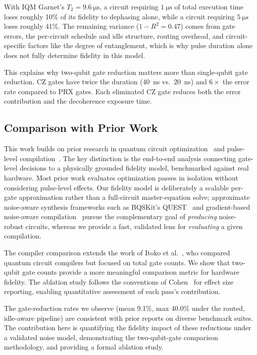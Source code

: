 \documentclass[sigconf,nonacm]{acmart}
\begin{document}
With IQM Garnet's $T_2 = \SI{9.6}{\micro\second}$, a circuit requiring $\SI{1}{\micro\second}$ of total execution time loses roughly 10\% of its fidelity to dephasing alone, while a circuit requiring $\SI{5}{\micro\second}$ loses roughly 41\%. The remaining variance ($1 - R^2 = 0.47$) comes from gate errors, the per-circuit schedule and idle structure, routing overhead, and circuit-specific factors like the degree of entanglement, which is why pulse duration alone does not fully determine fidelity in this model.

This explains why two-qubit gate reduction matters more than single-qubit gate reduction. CZ gates have twice the duration (\SI{40}{\nano\second} vs.\ \SI{20}{\nano\second}) and $6\times$ the error rate compared to PRX gates. Each eliminated CZ gate reduces both the error contribution and the decoherence exposure time.

\subsection{Comparison with Prior Work}

This work builds on prior research in quantum circuit optimization~\cite{nam2018automated, kissinger2020reducing, maslov2008quantum} and pulse-level compilation~\cite{shi2019optimized, khaneja2005optimal}. The key distinction is the end-to-end analysis connecting gate-level decisions to a physically grounded fidelity model, benchmarked against real hardware. Most prior work evaluates optimization passes in isolation without considering pulse-level effects. Our fidelity model is deliberately a scalable per-gate approximation rather than a full-circuit master-equation solve; approximate noise-aware synthesis frameworks such as BQSKit's QUEST~\cite{patel2022robust} and gradient-based noise-aware compilation~\cite{cheng2024cognac} pursue the complementary goal of \emph{producing} noise-robust circuits, whereas we provide a fast, validated lens for \emph{evaluating} a given compilation.

The compiler comparison extends the work of Itoko et al.~\cite{itoko2020quantum}, who compared quantum circuit compilers but focused on total gate counts. We show that two-qubit gate counts provide a more meaningful comparison metric for hardware fidelity. The ablation study follows the conventions of Cohen~\cite{cohen1988statistical} for effect size reporting, enabling quantitative assessment of each pass's contribution.

The gate-reduction rates we observe (mean 9.1\%, max 40.0\% under the routed, idle-aware pipeline) are consistent with prior reports on diverse benchmark suites. The contribution here is quantifying the fidelity impact of these reductions under a validated noise model, demonstrating the two-qubit-gate comparison methodology, and providing a formal ablation study.
\end{document}

